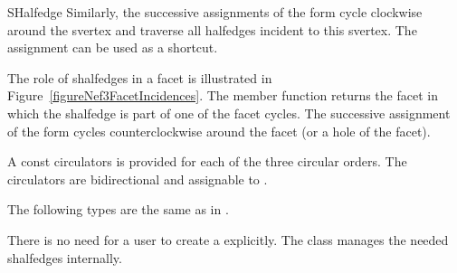 \begin{ccRefClass}{SHalfedge}
Similarly, the successive
assignments of the form  cycle
clockwise around the svertex and traverse all halfedges incident to
this svertex. The assignment  can be 
used as a shortcut.

The role of shalfedges in a facet is illustrated in 
Figure~\ref{figureNef3FacetIncidences}.
The  member function returns the facet in which
the shalfedge is part of one of the facet cycles. The successive assignment of 
the form  cycles counterclockwise around the facet (or a
hole of the facet).

A const circulators is provided for each of the three circular orders.
The circulators are bidirectional and assignable to .


\ccTypes
{}
\ccThreeToTwo

The following types are the same as in .



\ccGlue
{}
\ccGlue
{}
\ccGlue
{}

\ccCreation
{}

There is no need for a user to create a  explicitly. The
class  manages the needed shalfedges internally.


\ccOperations







\end{ccRefClass}
